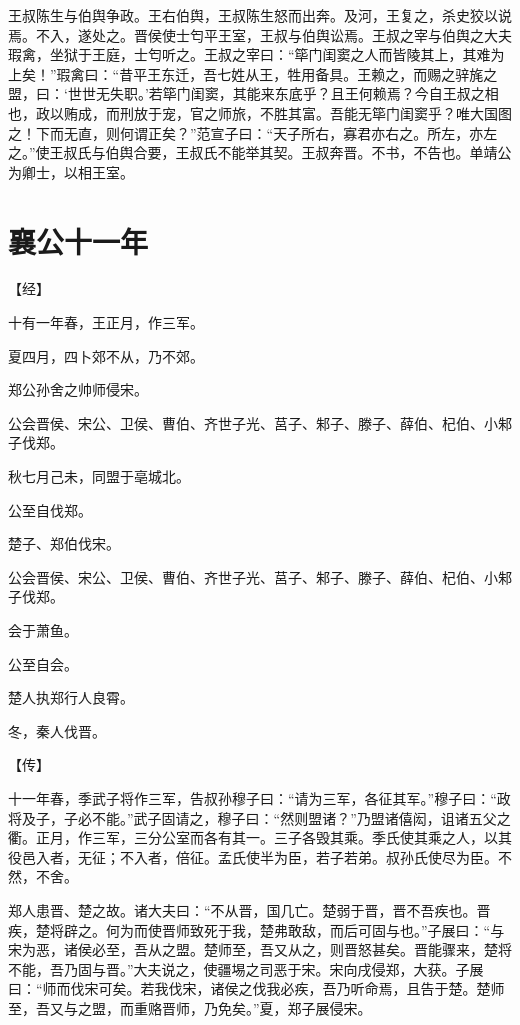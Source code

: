 \documentclass[a4paper,12pt,UTF8,twoside]{ctexbook}
\begin{document}
王叔陈生与伯舆争政。王右伯舆，王叔陈生怒而出奔。及河，王复之，杀史狡以说焉。不入，遂处之。晋侯使士匄平王室，王叔与伯舆讼焉。王叔之宰与伯舆之大夫瑕禽，坐狱于王庭，士匄听之。王叔之宰曰：“筚门闺窦之人而皆陵其上，其难为上矣！”瑕禽曰：“昔平王东迁，吾七姓从王，牲用备具。王赖之，而赐之骍旄之盟，曰：‘世世无失职。’若筚门闺窦，其能来东底乎？且王何赖焉？今自王叔之相也，政以贿成，而刑放于宠，官之师旅，不胜其富。吾能无筚门闺窦乎？唯大国图之！下而无直，则何谓正矣？”范宣子曰：“天子所右，寡君亦右之。所左，亦左之。”使王叔氏与伯舆合要，王叔氏不能举其契。王叔奔晋。不书，不告也。单靖公为卿士，以相王室。

\chapter{襄公十一年}



【经】

十有一年春，王正月，作三军。

夏四月，四卜郊不从，乃不郊。

郑公孙舍之帅师侵宋。

公会晋侯、宋公、卫侯、曹伯、齐世子光、莒子、邾子、滕子、薛伯、杞伯、小邾子伐郑。

秋七月己未，同盟于亳城北。

公至自伐郑。

楚子、郑伯伐宋。

公会晋侯、宋公、卫侯、曹伯、齐世子光、莒子、邾子、滕子、薛伯、杞伯、小邾子伐郑。

会于萧鱼。

公至自会。

楚人执郑行人良霄。

冬，秦人伐晋。

【传】

十一年春，季武子将作三军，告叔孙穆子曰：“请为三军，各征其军。”穆子曰：“政将及子，子必不能。”武子固请之，穆子曰：“然则盟诸？”乃盟诸僖闳，诅诸五父之衢。正月，作三军，三分公室而各有其一。三子各毁其乘。季氏使其乘之人，以其役邑入者，无征；不入者，倍征。孟氏使半为臣，若子若弟。叔孙氏使尽为臣。不然，不舍。

郑人患晋、楚之故。诸大夫曰：“不从晋，国几亡。楚弱于晋，晋不吾疾也。晋疾，楚将辟之。何为而使晋师致死于我，楚弗敢敌，而后可固与也。”子展曰：“与宋为恶，诸侯必至，吾从之盟。楚师至，吾又从之，则晋怒甚矣。晋能骤来，楚将不能，吾乃固与晋。”大夫说之，使疆埸之司恶于宋。宋向戌侵郑，大获。子展曰：“师而伐宋可矣。若我伐宋，诸侯之伐我必疾，吾乃听命焉，且告于楚。楚师至，吾又与之盟，而重赂晋师，乃免矣。”夏，郑子展侵宋。
\end{document}
